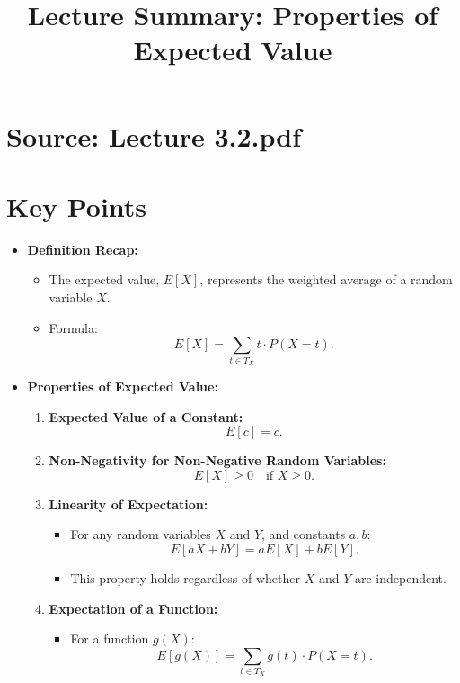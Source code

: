 \documentclass{article}
\title{Lecture Summary: Properties of Expected Value}
\author{}
\date{}
\begin{document}
\maketitle

\section*{Source: Lecture 3.2.pdf}

\section*{Key Points}

\begin{itemize}
  \item \textbf{Definition Recap:}
    \begin{itemize}
      \item The expected value, $E[X]$, represents the weighted average of a random variable $X$.
      \item Formula:
        \[
          E[X] = \sum_{t \in T_X} t \cdot P(X = t).
        \]
    \end{itemize}

  \item \textbf{Properties of Expected Value:}
    \begin{enumerate}
      \item \textbf{Expected Value of a Constant:}
        \[
          E[c] = c.
        \]
      \item \textbf{Non-Negativity for Non-Negative Random Variables:}
        \[
          E[X] \geq 0 \quad \text{if } X \geq 0.
        \]
      \item \textbf{Linearity of Expectation:}
        \begin{itemize}
          \item For any random variables $X$ and $Y$, and constants $a, b$:
            \[
              E[aX + bY] = aE[X] + bE[Y].
            \]
          \item This property holds regardless of whether $X$ and $Y$ are independent.
        \end{itemize}
      \item \textbf{Expectation of a Function:}
        \begin{itemize}
          \item For a function $g(X)$:
            \[
              E[g(X)] = \sum_{t \in T_X} g(t) \cdot P(X = t).
            \]
        \end{itemize}
    \end{enumerate}


\end{itemize}
\end{document}
